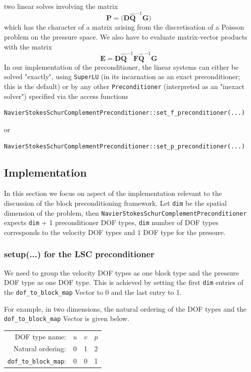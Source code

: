 two linear solves involving the matrix
\begin{equation*}
{\mathbf P} = \big({\mathbf D} \widehat{\mathbf Q}^{-1}{\mathbf G} \big)
\end{equation*}
which has the character of a matrix arising from the discretisation 
of a Poisson problem on the pressure space. We also have
to evaluate matrix-vector products with the matrix 
\begin{equation*}
{\mathbf E}={\mathbf D}\widehat{\mathbf Q}^{-1}{\mathbf F}\widehat{\mathbf Q}^{-1}{\mathbf G}
\end{equation*}
In our implementation of the preconditioner, the linear systems
can either be solved "exactly", using \verb+SuperLU+ (in its incarnation
as an exact preconditioner; this is the default) or by any 
other \verb+Preconditioner+ (interpreted as an "inexact solver")
specified via the access functions
\begin{verbatim}
NavierStokesSchurComplementPreconditioner::set_f_preconditioner(...)
\end{verbatim}
or 
\begin{verbatim}
NavierStokesSchurComplementPreconditioner::set_p_preconditioner(...)
\end{verbatim}

\subsection{Implementation\label{sec:lsc_implementation}}
In this section we focus on aspect of the implementation relevant to the 
discussion of the block preconditioning framework.
Let \verb+dim+ be the spatial dimension of the problem, then \verb+NavierStokesSchurComplementPreconditioner+ expects 
\verb+dim+ + 1 preconditioner DOF types, \verb+dim+ number of DOF types corresponds to the velocity DOF types and 1 DOF type for the pressure. 

\subsubsection{setup(...) for the LSC preconditioner\label{sec:lsc_implementation_setup}}
We need to group the velocity DOF types as one block type and the pressure DOF type as one DOF type. This is achieved by setting the first \verb+dim+ entries of the \verb+dof_to_block_map+ Vector to 0 and the last entry to 1.

For example, in two dimensions, the natural ordering of the DOF types and the \verb+dof_to_block_map+ Vector is given below.
\begin{center}
    \begin{tabular}{ | r | c c c |}
    \hline
    DOF type name: & $u$ & $v$ & $p$ \\ 
    Natural ordering: & 0 & 1 & 2 \\ 
    \verb+dof_to_block_map+: & 0 & 0 & 1 \\ 
    \hline
    \end{tabular}
\end{center}


